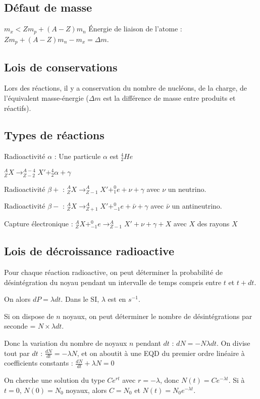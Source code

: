 \documentclass[french]{yLectureNote}
\begin{document}
\subsection{Défaut de masse}
$m_x < Zm_p+(A-Z)m_n$ Énergie de liaison de l'atome : $Zm_p+(A-Z)m_n - m_x = \Delta m$.
\subsection{Lois de conservations}
Lors des réactions, il y a conservation du nombre de nucléons, de la charge, de l'équivalent masse-énergie ($\Delta m$ est la différence de masse entre produits et réactifs).
\subsection{Types de réactions}
Radioactivité $\alpha$ : Une particule $\alpha$ est $^4_2He$

$^A_ZX\rightarrow _{Z-2}^{A-4}X' + ^4_2\alpha + \gamma$

Radioactivité $\beta +$ : $^A_ZX\rightarrow _{Z-1}^{A}X' + ^0_1e + \nu + \gamma$ avec $\nu$ un neutrino.

Radioactivité $\beta -$ : $^A_ZX\rightarrow _{Z+1}^{A}X' + ^0_{-1}e + \bar{\nu} + \gamma$ avec $\bar{\nu}$ un antineutrino.

Capture électronique : $^A_ZX + ^0_{-1}e \rightarrow _{Z-1}^{A}X' + \nu + \gamma + X$ avec $X$ des rayons $X$
\subsection{Lois de décroissance radioactive}
Pour chaque réaction radioactive, on peut déterminer la probabilité de désintégration du noyau pendant un intervalle de temps compris entre $t$ et $t+dt$.

On alors $dP = \lambda dt$. Dans le SI, $\lambda$ est en $s^{-1}$.

Si on dispose de $n$ noyaux, on peut déterminer le nombre de désintégrations par seconde = $N\times \lambda dt$.

Donc la variation du nombre de noyaux $n$ pendant $dt$ : $dN = -N\lambda dt$. On divise tout par $dt$ : $\frac{dN}{dt} = -\lambda N$, et on aboutit à une EQD du premier ordre linéaire à coefficients constants : $\frac{dN}{dt} +\lambda N= 0 $

On cherche une solution du type $Ce^{rt}$ avec $r=-\lambda$, donc $N(t) = Ce^{-\lambda t}$. Si à $t=0$, $N(0) = N_0$ noyaux, alors $C=N_0$ et $N(t) = N_0e^{-\lambda t}$.
\end{document}
